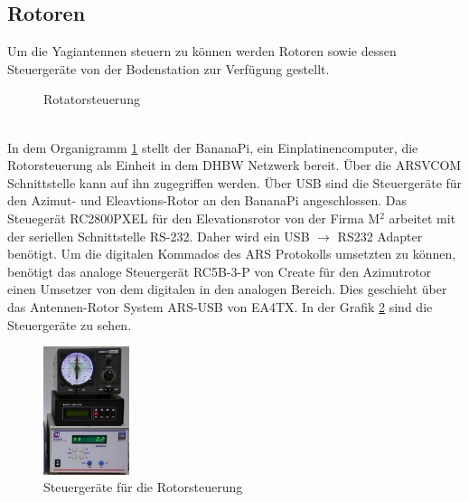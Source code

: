 \subsection{Rotoren}
Um die Yagiantennen steuern zu können werden Rotoren sowie dessen Steuergeräte von der Bodenstation zur Verfügung gestellt.
\begin{figure}[h]
	\centering
	
	\caption{Rotatorsteuerung}
	\label{fig:azel}
\end{figure}\\
In dem Organigramm \ref{fig:azel} stellt der BananaPi, ein Einplatinencomputer, die Rotorsteuerung als Einheit in dem DHBW Netzwerk bereit. Über die 
ARSVCOM Schnittstelle kann auf ihn zugegriffen werden. %
Über USB sind die Steuergeräte für den Azimut- und Eleavtions-Rotor an den BananaPi angeschlossen. Das Steuegerät RC2800PXEL für den Elevationsrotor 
von der Firma M$^2$ arbeitet mit der seriellen Schnittstelle RS-232. Daher wird ein USB $\rightarrow$ RS232 Adapter benötigt. Um die digitalen 
Kommados des ARS Protokolls umsetzten zu können, benötigt das analoge Steuergerät RC5B-3-P von Create für den Azimutrotor einen Umsetzer von dem 
digitalen in den analogen Bereich. Dies geschieht über das Antennen-Rotor System ARS-USB von EA4TX. In der Grafik \ref{fig:rot} sind die Steuergeräte 
zu sehen.
\begin{figure}[h]
	\centering
	\includegraphics[width=0.225\textwidth]{images/sat-rotor-steuerungen}
	\caption{Steuergeräte für die Rotorsteuerung}
	\label{fig:rot}
\end{figure}
\clearpage

